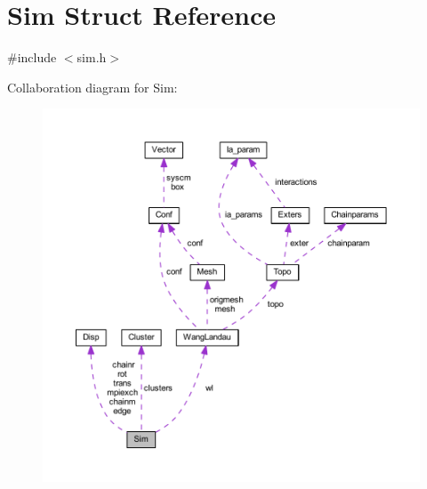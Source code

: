 \hypertarget{struct_sim}{\section{Sim Struct Reference}
\label{struct_sim}
}


{\ttfamily \#include $<$sim.\+h$>$}



Collaboration diagram for Sim\+:\nopagebreak
\begin{figure}[H]
\begin{center}
\leavevmode
\includegraphics[width=350pt]{struct_sim__coll__graph}
\end{center}
\end{figure}
